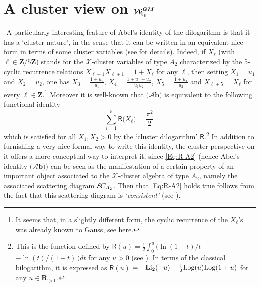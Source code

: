 \documentclass[11pt]{amsart}
\newcommand{\sk}{\smallskip}
\begin{document}
\section{\bf A cluster view on  $\boldsymbol{\boldsymbol{\mathcal W}^{GM}_{\hspace{-0.1cm} \boldsymbol{\mathbb S}_5}}$}
\label{SS:Cluster-View}
${}^{}$
A particularly interesting feature of Abel's identity  of the dilogarithm is that it has a  `cluster nature', in the sense that it can be written in an equivalent nice form in terms of some cluster variables (see \cite{ClusterWebs} for details).  Indeed,  if $X_\ell$ (with $\ell \in \mathbf Z/5\mathbf Z$)  stands for the $\mathscr X$-cluster variables of type $A_2$ characterized by the 5-cyclic recurrence relations $X_{\ell-1}X_{\ell+1}=1+X_\ell$ for any 
$\ell$, then setting $X_1=u_1$ and $X_2=u_2$,  one has $X_3=\frac{1+u_2}{u_1}$, $X_4=\frac{1+u_1+u_2}{u_1u_2}$, $X_5=\frac{1+u_1}{u_2}$ and $X_{\ell+5}=X_\ell$ for every $\ell\in \mathbf Z$.\footnote{It seems that, in a slightly different form, the cyclic recurrence of the $X_\ell$'s was already known to Gauss, see \href{https://www.math.uni-bielefeld.de/~sek/cluster/pentagramma/}{here}.}
Moreover it is well-known that 
$\boldsymbol{ \big({\mathcal{A}b}\big)}$ is equivalent to the following functional identity
\begin{equation}
\label{Eq:R-A2}
\sum_{i=1}^5 \mathsf{R}\big(X_\ell\big)=\frac{{}^{} \pi^2}{2}\, 
\end{equation}
which is satisfied for all $X_1,X_2>0$ by the `cluster dilogarithm' $\mathsf{R}$.\footnote{This is the function defined by  $\mathsf{R}(u)=\frac{1}{2} \int_{0}^u 
\big( {\ln(1+t)}/{t}$ $-  {\ln(t)}/{(1+t)}\,
\big) dt   $
for any $u>0$ (see \cite[\S2.2.2.1]{ClusterWebs}). In terms of the classical bilogarithm, it is expressed as ${\mathsf R}(u)$ $= -{\bf L}{\rm i}_{2} (-u)-\frac{1}{2} {\rm Log}(u){\rm Log}(1+u)$ for  any $u\in \mathbf R_{>0}$.}
In addition to furnishing a very nice formal way to write this identity, the cluster perspective on it offers a more conceptual way to interpret it, since 
\eqref{Eq:R-A2} (hence Abel's identity $\boldsymbol{ \big({\mathcal{A}b}\big)}$)
 can be seen as the manifestation of a certain property of an important object associated to the $\mathscr X$-cluster algebra of type $A_2$, namely the associated scattering diagram $S\hspace{-0.05cm}C_{A_2}$.  Then that \eqref{Eq:R-A2} holds true follows from the 
fact that  this scattering diagram is {\it `consistent'} (see \cite[Theorem 3.6]{Nakanishi}). 
\sk 
\end{document}
